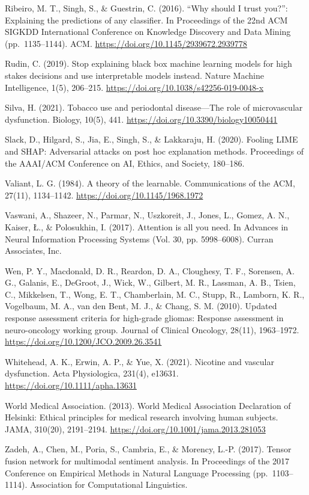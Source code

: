 \documentclass[
]{article}
\begin{document}
Ribeiro, M. T., Singh, S., \& Guestrin, C. (2016). ``Why should I trust
you?'': Explaining the predictions of any classifier. In Proceedings of
the 22nd ACM SIGKDD International Conference on Knowledge Discovery and
Data Mining (pp.~1135--1144). ACM.
\url{https://doi.org/10.1145/2939672.2939778}

Rudin, C. (2019). Stop explaining black box machine learning models for
high stakes decisions and use interpretable models instead. Nature
Machine Intelligence, 1(5), 206--215.
\href{https://www.google.com/search?q=https\%3A\%2F\%2Fdoi.org\%2F10.1038\%2Fs42256-019-0048-x}{https://doi.org/10.1038/s42256-019-0048-x}

Silva, H. (2021). Tobacco use and periodontal disease---The role of
microvascular dysfunction. Biology, 10(5), 441.
\href{https://www.google.com/search?q=https\%3A\%2F\%2Fdoi.org\%2F10.3390\%2Fbiology10050441}{https://doi.org/10.3390/biology10050441}

Slack, D., Hilgard, S., Jia, E., Singh, S., \& Lakkaraju, H. (2020).
Fooling LIME and SHAP: Adversarial attacks on post hoc explanation
methods. Proceedings of the AAAI/ACM Conference on AI, Ethics, and
Society, 180--186.

Valiant, L. G. (1984). A theory of the learnable. Communications of the
ACM, 27(11), 1134--1142.
\href{https://www.google.com/search?q=https\%3A\%2F\%2Fdoi.org\%2F10.1145\%2F1968.1972}{https://doi.org/10.1145/1968.1972}

Vaswani, A., Shazeer, N., Parmar, N., Uszkoreit, J., Jones, L., Gomez,
A. N., Kaiser, Ł., \& Polosukhin, I. (2017). Attention is all you need.
In Advances in Neural Information Processing Systems (Vol. 30, pp.
5998--6008). Curran Associates, Inc.

Wen, P. Y., Macdonald, D. R., Reardon, D. A., Cloughesy, T. F.,
Sorensen, A. G., Galanis, E., DeGroot, J., Wick, W., Gilbert, M. R.,
Lassman, A. B., Tsien, C., Mikkelsen, T., Wong, E. T., Chamberlain, M.
C., Stupp, R., Lamborn, K. R., Vogelbaum, M. A., van den Bent, M. J., \&
Chang, S. M. (2010). Updated response assessment criteria for high-grade
gliomas: Response assessment in neuro-oncology working group. Journal of
Clinical Oncology, 28(11), 1963--1972.
\href{https://www.google.com/search?q=https\%3A\%2F\%2Fdoi.org\%2F10.1200\%2FJCO.2009.26.3541}{https://doi.org/10.1200/JCO.2009.26.3541}

Whitehead, A. K., Erwin, A. P., \& Yue, X. (2021). Nicotine and vascular
dysfunction. Acta Physiologica, 231(4), e13631.
\href{https://www.google.com/search?q=https\%3A\%2F\%2Fdoi.org\%2F10.1111\%2Fapha.13631}{https://doi.org/10.1111/apha.13631}

World Medical Association. (2013). World Medical Association Declaration
of Helsinki: Ethical principles for medical research involving human
subjects. JAMA, 310(20), 2191--2194.
\href{https://www.google.com/search?q=https\%3A\%2F\%2Fdoi.org\%2F10.1001\%2Fjama.2013.281053}{https://doi.org/10.1001/jama.2013.281053}

Zadeh, A., Chen, M., Poria, S., Cambria, E., \& Morency, L.-P. (2017).
Tensor fusion network for multimodal sentiment analysis. In Proceedings
of the 2017 Conference on Empirical Methods in Natural Language
Processing (pp.~1103--1114). Association for Computational Linguistics.
\end{document}
